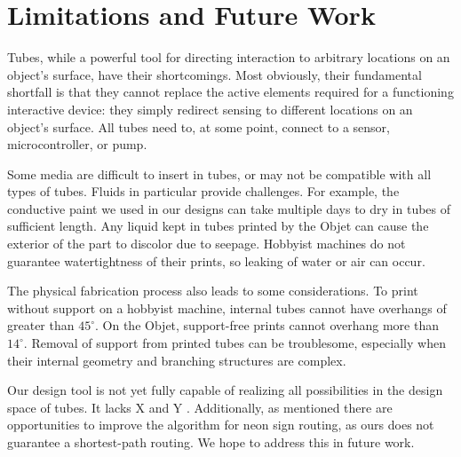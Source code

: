 \section{Limitations and Future Work}
Tubes, while a powerful tool for directing interaction to arbitrary locations on an object's surface, have their shortcomings.  Most obviously, their fundamental shortfall is that they cannot replace the active elements required for a functioning interactive device: they simply redirect sensing to different locations on an object's surface.  All tubes need to, at some point, connect to a sensor, microcontroller, or pump.

Some media are difficult to insert in tubes, or may not be compatible with all types of tubes.  Fluids in particular provide challenges.  For example, the conductive paint we used in our designs can take multiple days to dry in tubes of sufficient length.  Any liquid kept in tubes printed by the Objet can cause the exterior of the part to discolor due to seepage.  Hobbyist machines do not guarantee watertightness of their prints, so leaking of water or air can occur.

The physical fabrication process also leads to some considerations.  To print without support on a hobbyist machine, internal tubes cannot have overhangs of greater than $45^{\circ}$.  On the Objet, support-free prints cannot overhang more than $14^{\circ}$.  Removal of support from printed tubes can be troublesome, especially when their internal geometry and branching structures are complex.

Our design tool is not yet fully capable of realizing all possibilities in the design space of tubes.  It lacks X and Y .  Additionally, as mentioned there are opportunities to improve the algorithm for neon sign routing, as ours does not guarantee a shortest-path routing.  We hope to address this in future work.

